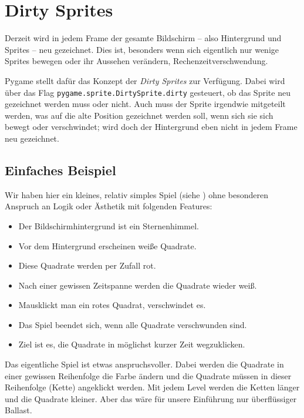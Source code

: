 \newpage
\section{Dirty Sprites}\label{secDirtySprites}
Derzeit wird in jedem Frame der gesamte Bildschirm -- also Hintergrund und Sprites -- neu gezeichnet. Dies ist, besonders wenn sich eigentlich nur wenige Sprites bewegen oder ihr Aussehen verändern, Rechenzeitverschwendung. 

Pygame stellt dafür das Konzept der \emph{Dirty Sprites} zur Verfügung. Dabei wird über das Flag \texttt{pygame.sprite.DirtySprite.dirty} gesteuert, ob das Sprite neu gezeichnet werden muss oder nicht. Auch muss der Sprite irgendwie mitgeteilt werden, was auf die alte Position gezeichnet werden soll, wenn sich sie sich bewegt oder verschwindet; wird doch der Hintergrund eben nicht in jedem Frame neu gezeichnet.



\subsection{Einfaches Beispiel}
Wir haben hier ein kleines, relativ simples Spiel (siehe ) ohne besonderen Anspruch an Logik oder Ästhetik mit folgenden Features:
\begin{itemize}
	\item Der Bildschirmhintergrund ist ein Sternenhimmel.
	\item Vor dem Hintergrund erscheinen weiße Quadrate. 
	\item Diese Quadrate werden per Zufall rot.
	\item Nach einer gewissen Zeitspanne werden die Quadrate wieder weiß.
	\item Mausklickt man ein rotes Quadrat, verschwindet es.
	\item Das Spiel beendet sich, wenn alle Quadrate verschwunden sind.
	\item Ziel ist es, die Quadrate in möglichst kurzer Zeit wegzuklicken.
\end{itemize}

Das eigentliche Spiel ist etwas anspruchsvoller. Dabei werden die Quadrate in einer gewissen Reihenfolge die Farbe ändern und die Quadrate müssen in dieser Reihenfolge (Kette) angeklickt werden. Mit jedem Level werden die Ketten länger und die Quadrate kleiner. Aber das wäre für unsere Einführung  nur überflüssiger Ballast.

